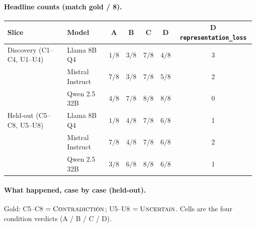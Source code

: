 \documentclass[11pt,a4paper]{article}
\newcommand{\unc}{\textsc{Uncertain}}
\newcommand{\con}{\textsc{Contradiction}}
\begin{document}
\paragraph{Headline counts (match gold / 8).}
\begin{center}
\small
\begin{tabular}{llccccc}
\toprule
Slice & Model & A & B & C & D & D \texttt{representation\_loss} \\
\midrule
Discovery (C1--C4, U1--U4)
  & Llama 8B Q4 & $1/8$ & $3/8$ & $7/8$ & $4/8$ & 3 \\
  & Mistral Instruct & $7/8$ & $3/8$ & $7/8$ & $5/8$ & 2 \\
  & Qwen 2.5 32B & $4/8$ & $7/8$ & $8/8$ & $8/8$ & 0 \\
\midrule
Held-out (C5--C8, U5--U8)
  & Llama 8B Q4 & $1/8$ & $4/8$ & $7/8$ & $6/8$ & 1 \\
  & Mistral Instruct & $7/8$ & $4/8$ & $7/8$ & $6/8$ & 2 \\
  & Qwen 2.5 32B & $3/8$ & $6/8$ & $8/8$ & $6/8$ & 1 \\
\bottomrule
\end{tabular}
\end{center}

\paragraph{What happened, case by case (held-out).}
Gold: C5--C8 $=\con{}$; U5--U8 $=\unc{}$.
Cells are the four condition verdicts (A / B / C / D).
\end{document}
